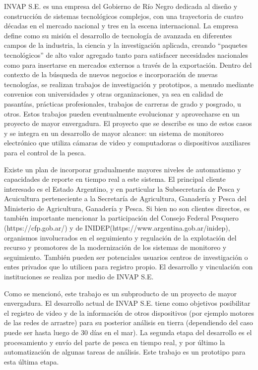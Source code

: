\documentclass[11pt]{charter}
\begin{document}
INVAP S.E. es una empresa del Gobierno de Río Negro dedicada al diseño y construcción de sistemas tecnológicos complejos, con una trayectoria de cuatro décadas en el mercado nacional y tres en la escena internacional. La empresa define como su misión el desarrollo de tecnología de avanzada en diferentes campos de la industria, la ciencia y la investigación aplicada, creando “paquetes tecnológicos” de alto valor agregado tanto para satisfacer necesidades nacionales como para insertarse en mercados externos a través de la exportación.
Dentro del contexto de la búsqueda de nuevos negocios e incorporación de nuevas tecnologías, se realizan trabajos de investigación y prototipos, a menudo mediante convenios con universidades y otras organizaciones, ya sea en calidad de pasantías, prácticas profesionales, trabajos de carreras de grado y posgrado, u otros. Estos trabajos pueden eventualmente evolucionar y aprovecharse en un proyecto de mayor envergadura.
El proyecto que se describe es uno de estos casos y se integra en un desarrollo de mayor alcance: un sistema de monitoreo electrónico que utiliza cámaras de video y computadoras o dispositivos auxiliares para el control de la pesca. 

Existe un plan de incorporar gradualmente mayores niveles de automatismo y capacidades de reporte en tiempo real a este sistema. 
El principal cliente interesado es el Estado Argentino, y en particular la Subsecretaría de Pesca y Acuicultura perteneciente a la Secretaría de Agricultura, Ganadería y Pesca del Ministerio de Agricultura, Ganadería y Pesca. Si bien no son clientes directos, es también importante mencionar la participación del Consejo Federal Pesquero (https://cfp.gob.ar/) y de INIDEP(https://www.argentina.gob.ar/inidep), organismos involucrados en el seguimiento y regulación de la explotación del recurso y promotores de la modernización de los sistemas de monitoreo y seguimiento. También pueden ser potenciales usuarios centros de investigación o entes privados que lo utilicen para registro propio. El desarrollo y vinculación con instituciones se realiza por medio de INVAP S.E.

Como se mencionó, este trabajo es un subproducto de un proyecto de mayor envergadura. El desarrollo actual de INVAP S.E. tiene como objetivos posibilitar el registro de video y de la información de otros dispositivos (por ejemplo motores de las redes de arrastre) para su posterior análisis en tierra (dependiendo del caso puede ser hasta luego de 30 días en el mar). La segunda etapa del desarrollo es el procesamiento y envío del parte de pesca en tiempo real, y por último la automatización de algunas tareas de análisis. Este trabajo es un prototipo para esta última etapa. 
\end{document}
